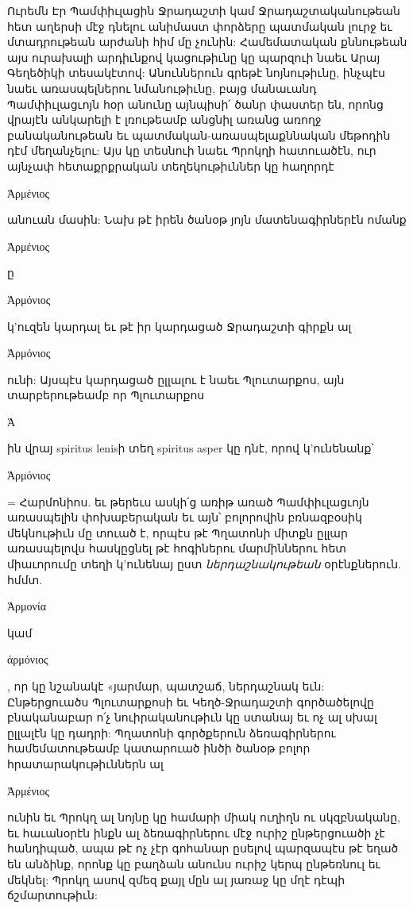\documentclass{article}
\begin{document}
{Ուրեմն Էր Պամփիւլացին Ջրադաշտի կամ Ջրադաշտականութեան հետ աղերսի մէջ դնելու անիմաստ փորձերը պատմական լուրջ եւ մտադրութեան արժանի հիմ մը չունին: Համեմատական քննութեան այս ուրախալի արդիւնքով կացութիւնը կը պարզուի նաեւ Արայ Գեղեծիկի տեսակէտով: Անուններուն գրեթէ նոյնութիւնը, ինչպէս նաեւ առասպելներու նմանութիւնը, բայց մանաւանդ Պամփիւլացւոյն հօր անունը այնպիսի՛ ծանր փաստեր են, որոնց վրայէն անկարելի է լռութեամբ անցնիլ առանց առողջ բանականութեան եւ պատմական-առասպելաքննական մեթոդին դէմ մեղանչելու: Այս կը տեսնուի նաեւ Պրոկղի հատուածէն, ուր այնչափ հետաքրքրական տեղեկութիւններ կը հաղորդէ \begin{greek}Ἀρμένιος\end{greek} անուան մասին: Նախ թէ իրեն ծանօթ յոյն մատենագիրներէն ոմանք \begin{greek}Ἀρμένιος\end{greek}ը \begin{greek}Ἀρμόνιος\end{greek} կ'ուզեն կարդալ եւ թէ իր կարդացած Ջրադաշտի գիրքն ալ \begin{greek}Ἀρμόνιος\end{greek} ունի: Այսպէս կարդացած ըլլալու է նաեւ Պլուտարքոս, այն տարբերութեամբ որ Պլուտարքոս \begin{greek}Ἁ\end{greek}ին վրայ spiritus lenisի տեղ spiritus asper կը դնէ, որով կ'ունենանք՝ \begin{greek}Ἁρμόνιος\end{greek} = Հարմոնիոս. եւ թերեւս ասկի՛ց առիթ առած Պամփիւլացւոյն առասպելին փոխաբերական եւ այն՝ բոլորովին բռնազբօսիկ մեկնութիւն մը տուած է, որպէս թէ Պղատոնի միտքն ըլլար առասպելովս հասկըցնել թէ հոգիներու մարմիններու հետ միաւորումը տեղի կ'ունենայ ըստ \emph{ներդաշնակութեան} օրէնքներուն. հմմտ. \begin{greek}Ἁρμονία\end{greek} կամ \begin{greek}ἁρμόνιος\end{greek}, որ կը նշանակէ «յարմար, պատշաճ, ներդաշնակ եւն: Ընթերցուածս Պլուտարքոսի եւ Կեղծ-Ջրադաշտի գործածելովը բնականաբար ո՛չ նուիրականութիւն կը ստանայ եւ ոչ ալ սխալ ըլլալէն կը դադրի: Պղատոնի գործքերուն ձեռագիրներու համեմատութեամբ կատարուած ինծի ծանօթ բոլոր հրատարակութիւններն ալ \begin{greek}Ἀρμένιος\end{greek} ունին եւ Պրոկղ ալ նոյնը կը համարի միակ ուղիղն ու սկզբնականը, եւ հաւանօրէն ինքն ալ ձեռագիրներու մէջ ուրիշ ընթերցուածի չէ հանդիպած, ապա թէ ոչ չէր գոհանար ըսելով պարզապէս թէ եղած են անձինք, որոնք կը բաղձան անունս ուրիշ կերպ ընթեռնուլ եւ մեկնել: Պրոկղ ասով զմեզ քայլ մըն ալ յառաջ կը մղէ դէպի ճշմարտութիւն:

}
\end{document}
